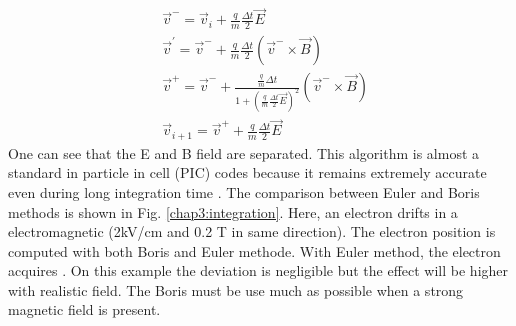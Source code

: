 \begin{refsection}
	\begin{align}
		 & \vec{v}^{-} = \vec{v}_{i} + \frac{q}{m} \frac{\Delta t}{2}\vec{E}                                                                 \\
		 & \vec{v}^{'} = \vec{v}^{-} + \frac{q}{m} \frac{\Delta t}{2}(\vec{v}^{-} \times \vec{B})                                            \\
		 & \vec{v}^{+} = \vec{v}^{-} + \frac{\frac{q}{m}\Delta t}{1+(\frac{q}{m} \frac{\Delta t}{2}\vec{E})^{2}}(\vec{v}^{-} \times \vec{B}) \\
		 & \vec{v}_{i+1} = \vec{v}^{+} + \frac{q}{m} \frac{\Delta t}{2}\vec{E}
	\end{align}
	One can see that the E and B field are separated. This algorithm is almost a standard in particle in cell (PIC) codes because it remains extremely accurate even during long integration time \cite{Qin2013}. The comparison between Euler and Boris methods is shown in Fig. \ref{chap3:integration}. Here, an electron drifts in a electromagnetic (2kV/cm and 0.2 T in same direction). The electron position is computed with both Boris and Euler methode. With Euler method, the electron acquires . On this example the deviation is negligible but the effect will be higher with realistic field. The Boris must be use much as possible when a strong magnetic field is present.


\end{refsection}
